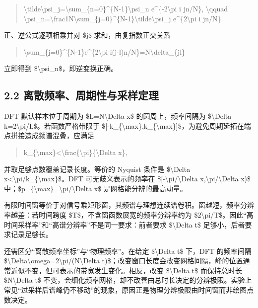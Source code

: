 \documentclass[UTF8,openany,11pt,fontset=fandol]{ctexbook}
\begin{document}
\begin{quote}
\textbackslash tilde\textbackslash psi\_j=\textbackslash sum\_\{n=0\}\^{}\{N-1\}\textbackslash psi\_n
e\^{}\{-2\textbackslash pi i jn/N\}, \textbackslash qquad
\textbackslash psi\_n=\textbackslash frac1N\textbackslash sum\_\{j=0\}\^{}\{N-1\}\textbackslash tilde\textbackslash psi\_j
e\^{}\{2\textbackslash pi i jn/N\}.
\end{quote}

正、逆公式逐项相乘并对 \$j\$ 求和，由复指数正交关系

\begin{quote}
\textbackslash sum\_\{j=0\}\^{}\{N-1\}e\^{}\{2\textbackslash pi
i(j-l)n/N\}=N\textbackslash delta\_\{jl\}
\end{quote}

立即得到 \$\textbackslash psi\_n\$，即逆变换正确。

\subsection{\texorpdfstring{\textbf{2.2
离散频率、周期性与采样定理}}{2.2 离散频率、周期性与采样定理}}\label{ux79bbux6563ux9891ux7387ux5468ux671fux6027ux4e0eux91c7ux6837ux5b9aux7406}

DFT 默认样本位于周期为 \$L=N\textbackslash Delta x\$
的圆周上，频率间隔为 \$\textbackslash Delta
k=2\textbackslash pi/L\$。若函数严格带限于
\${[}-k\_\{\textbackslash max\},k\_\{\textbackslash max\}{]}\$，为避免周期延拓在端点拼接造成频谱混叠，应满足

\begin{quote}
k\_\{\textbackslash max\}\textless\textbackslash frac\{\textbackslash pi\}\{\textbackslash Delta
x\},
\end{quote}

并取足够点数覆盖记录长度。等价的 Nyquist 条件是 \$\textbackslash Delta
x\textless\textbackslash pi/k\_\{\textbackslash max\}\$。DFT
可无歧义表示的频率在 \${[}-\textbackslash pi/\textbackslash Delta
x,\textbackslash pi/\textbackslash Delta x)\$
中；\$p\_\{\textbackslash max\}=\textbackslash pi/\textbackslash Delta
x\$ 是网格能分辨的最高动量。

有限时间窗等价于对信号乘矩形窗，其频谱与理想连续谱卷积。窗越短，频率分辨率越差：若时间跨度
\$T\$，不含窗函数展宽的频率分辨率约为
\$2\textbackslash pi/T\$。因此``高时间采样率''和``高谱分辨率''不是同一要求：前者要求
\$\textbackslash Delta t\$ 足够小，后者要求记录足够长。

还需区分``离散频率坐标''与``物理频率''。在给定 \$\textbackslash Delta
t\$ 下，DFT 的频率间隔
\$\textbackslash Delta\textbackslash omega=2\textbackslash pi/(N\textbackslash Delta
t)\$；改变窗口长度会改变网格间隔，峰的位置通常近似不变，但可表示的带宽发生变化。相反，改变
\$\textbackslash Delta t\$ 而保持总时长 \$N\textbackslash Delta t\$
不变，会细化频率网格，却不改善由总时长决定的分辨极限。实验上常见``过采样后谱峰仍不移动''的现象，原因正是物理分辨极限由时间窗而非绘图点数决定。
\end{document}
